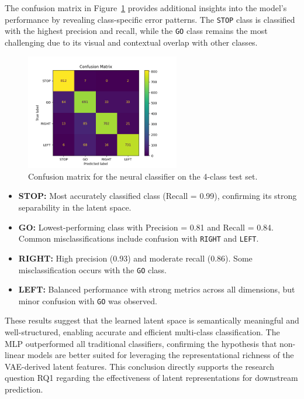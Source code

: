 The confusion matrix in Figure~\ref{fig:conf_matrix} provides additional insights into the model's performance by revealing class-specific error patterns. The \texttt{STOP} class is classified with the highest precision and recall, while the \texttt{GO} class remains the most challenging due to its visual and contextual overlap with other classes.

\begin{figure}[h]
    \centering
    \includegraphics[width=0.6\textwidth]{img/classifier/confusion_matrix_4_classes.png}
    \caption{Confusion matrix for the neural classifier on the 4-class test set.}
    \label{fig:conf_matrix}
\end{figure}

\begin{itemize}
    \item \textbf{STOP:} Most accurately classified class (Recall = 0.99), confirming its strong separability in the latent space.
    \item \textbf{GO:} Lowest-performing class with Precision = 0.81 and Recall = 0.84. Common misclassifications include confusion with \texttt{RIGHT} and \texttt{LEFT}.
    \item \textbf{RIGHT:} High precision (0.93) and moderate recall (0.86). Some misclassification occurs with the \texttt{GO} class.
    \item \textbf{LEFT:} Balanced performance with strong metrics across all dimensions, but minor confusion with \texttt{GO} was observed.
\end{itemize}

These results suggest that the learned latent space is semantically meaningful and well-structured, enabling accurate and efficient multi-class classification. The MLP outperformed all traditional classifiers, confirming the hypothesis that non-linear models are better suited for leveraging the representational richness of the VAE-derived latent features. This conclusion directly supports the research question RQ1 regarding the effectiveness of latent representations for downstream prediction.

